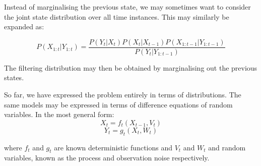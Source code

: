 Instead of marginalising the previous state, we may sometimes want to consider the joint state distribution over all time instances. This may similarly be expanded as:

\begin{equation}
P(X_{1:t}|Y_{1:t}) = \frac{P(Y_t|X_t)P(X_t|X_{t-1})P(X_{1:t-1}|Y_{1:t-1})}{P(Y_t|Y_{1:t-1})}
\label{eq:JointSeqBayesRule}
\end{equation}

The filtering distribution may then be obtained by marginalising out the previous states.

So far, we have expressed the problem entirely in terms of distributions. The same models may be expressed in terms of difference equations of random variables. In the most general form:
\begin{equation}
X_t = f_t(X_{t-1}, V_t)
\label{eq:FilterEq1}
\end{equation}
\begin{equation}
Y_t = g_t(X_t, W_t)
\label{eq:FilterEq2}
\end{equation}

where $f_t$ and $g_t$ are known deterministic functions and $V_t$ and $W_t$ and random variables, known as the process and observation noise respectively.